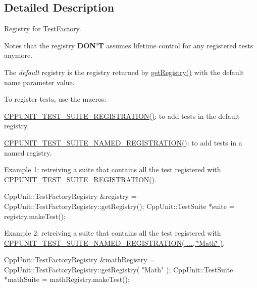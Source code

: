 \subsection{Detailed Description}
Registry for \hyperlink{class_test_factory}{Test\+Factory}.

Notes that the registry {\bfseries D\+O\+N'T} assumes lifetime control for any registered tests anymore. 

The {\itshape default} registry is the registry returned by \hyperlink{class_test_factory_registry_ac153260dae65c3e6e8ebc33ecde04ccb}{get\+Registry()} with the default name parameter value.

To register tests, use the macros\+:
\begin{DoxyItemize}
\item \hyperlink{group___creating_test_suite_ga2f4071eec88d1e306665ada0f2dd80e4}{C\+P\+P\+U\+N\+I\+T\+\_\+\+T\+E\+S\+T\+\_\+\+S\+U\+I\+T\+E\+\_\+\+R\+E\+G\+I\+S\+T\+R\+A\+T\+I\+O\+N()}\+: to add tests in the default registry.
\item \hyperlink{group___creating_test_suite_ga028a5855a40ad3836e2a26aa48cd4c91}{C\+P\+P\+U\+N\+I\+T\+\_\+\+T\+E\+S\+T\+\_\+\+S\+U\+I\+T\+E\+\_\+\+N\+A\+M\+E\+D\+\_\+\+R\+E\+G\+I\+S\+T\+R\+A\+T\+I\+O\+N()}\+: to add tests in a named registry.
\end{DoxyItemize}

Example 1\+: retreiving a suite that contains all the test registered with \hyperlink{group___creating_test_suite_ga2f4071eec88d1e306665ada0f2dd80e4}{C\+P\+P\+U\+N\+I\+T\+\_\+\+T\+E\+S\+T\+\_\+\+S\+U\+I\+T\+E\+\_\+\+R\+E\+G\+I\+S\+T\+R\+A\+T\+I\+O\+N()}. 
\begin{DoxyCode}
CppUnit::TestFactoryRegistry &registry = CppUnit::TestFactoryRegistry::getRegistry();
CppUnit::TestSuite *suite = registry.makeTest();
\end{DoxyCode}


Example 2\+: retreiving a suite that contains all the test registered with \hyperlink{group___creating_test_suite_ga028a5855a40ad3836e2a26aa48cd4c91}{C\+P\+P\+U\+N\+I\+T\+\_\+\+T\+E\+S\+T\+\_\+\+S\+U\+I\+T\+E\+\_\+\+N\+A\+M\+E\+D\+\_\+\+R\+E\+G\+I\+S\+T\+R\+A\+T\+I\+O\+N( ..., \char`\"{}\+Math\char`\"{} )}. 
\begin{DoxyCode}
CppUnit::TestFactoryRegistry &mathRegistry = CppUnit::TestFactoryRegistry::getRegistry( \textcolor{stringliteral}{"Math"} );
CppUnit::TestSuite *mathSuite = mathRegistry.makeTest();
\end{DoxyCode}


